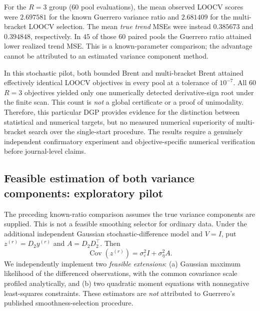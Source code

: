 \documentclass[11pt]{article}
\begin{document}
For the $R=3$ group (60 pool evaluations), the mean observed
LOOCV scores were $2.697581$ for the known Guerrero variance
ratio and $2.681409$ for the multi-bracket LOOCV selection.
The mean \emph{true trend} MSEs were instead $0.385673$
and $0.394848$, respectively. In $45$ of those $60$
paired pools the Guerrero ratio attained lower realized
trend MSE. This is a known-parameter comparison;
the advantage cannot be attributed to an estimated variance
component method.

In this stochastic pilot, both bounded Brent and
multi-bracket Brent attained effectively identical LOOCV
objectives in every pool at a tolerance of $10^{-7}$.
All $60$ $R=3$ objectives yielded only one
numerically detected derivative-sign root under the
finite scan. This count is \emph{not} a global certificate
or a proof of unimodality. Therefore, this particular
DGP provides evidence for the distinction between
statistical and numerical targets, but no measured
numerical superiority of multi-bracket search over the
single-start procedure. The results require a genuinely
independent confirmatory experiment and objective-specific
numerical verification before journal-level claims.

\subsection{Feasible estimation of both variance components: exploratory pilot}

The preceding known-ratio comparison assumes the true variance
components are supplied. This is not a feasible smoothing selector
for ordinary data. Under the additional independent Gaussian
stochastic-difference model and $V=I$, put $z^{(r)}=D_2y^{(r)}$ and
$A=D_2D_2^\top$. Then
\[
 \operatorname{Cov}(z^{(r)})=
 \sigma_\varepsilon^2 I+\sigma_\eta^2 A.
\]
We independently implement two \emph{feasible extensions}: (a)
Gaussian maximum likelihood of the differenced observations, with
the common covariance scale profiled analytically, and (b) two
quadratic moment equations with nonnegative least-squares
constraints. These estimators are \emph{not} attributed to
Guerrero's published smoothness-selection procedure.
\end{document}
